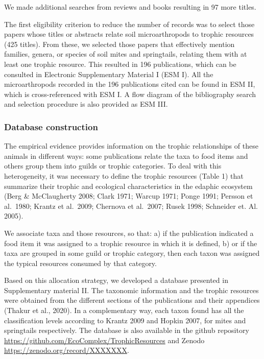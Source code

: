 \documentclass[10pt,oneside]{article}
\begin{document}
We made additional searches from reviews and books resulting in 97 more
titles.

The first eligibility criterion to reduce the number of records was to
select those papers whose titles or abstracts relate soil
microarthropods to trophic resources (425 titles). From these, we
selected those papers that effectively mention families, genera, or
species of soil mites and springtails, relating them with at least one
trophic resource. This resulted in 196 publications, which can be
consulted in Electronic Supplementary Material I (ESM I). All the
microarthropods recorded in the 196 publications cited can be found in
ESM II, which is cross-referenced with ESM I. A flow diagram of the
bibliography search and selection procedure is also provided as ESM III.

\hypertarget{database-construction}{%
\subsubsection{Database construction}\label{database-construction}}

The empirical evidence provides information on the trophic relationships
of these animals in different ways: some publications relate the taxa to
food items and others group them into guilds or trophic categories. To
deal with this heterogeneity, it was necessary to define the trophic
resources (Table 1) that summarize their trophic and ecological
characteristics in the edaphic ecosystem (Berg \& McClaugherty 2008;
Clark 1971; Warcup 1971; Ponge 1991; Persson et al.~1980; Krantz et
al.~2009; Chernova et al.~2007; Rusek 1998; Schneider et. Al. 2005).

We associate taxa and those resources, so that: a) if the publication
indicated a food item it was assigned to a trophic resource in which it
is defined, b) or if the taxa are grouped in some guild or trophic
category, then each taxon was assigned the typical resources consumed by
that category.

Based on this allocation strategy, we developed a database presented in
Supplementary material II. The taxonomic information and the trophic
resources were obtained from the different sections of the publications
and their appendices (Thakur et al., 2020). In a complementary way, each
taxon found has all the classification levels according to Krantz 2009
and Hopkin 2007, for mites and springtails respectively. The database is
also available in the github repository
\url{https://github.com/EcoComplex/TrophicResources} and Zenodo
\url{https://zenodo.org/record/XXXXXXX}.
\end{document}
